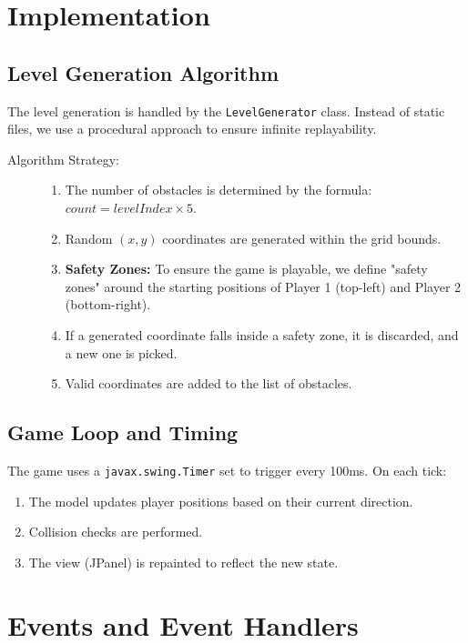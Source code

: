 \documentclass[12pt,a4paper]{article}
\begin{document}
\section{Implementation}

\subsection{Level Generation Algorithm}
The level generation is handled by the \texttt{LevelGenerator} class. Instead of static files, we use a procedural approach to ensure infinite replayability.

\begin{description}
    \item[Algorithm Strategy:]
    \begin{enumerate}
        \item The number of obstacles is determined by the formula: $count = levelIndex \times 5$.
        \item Random $(x, y)$ coordinates are generated within the grid bounds.
        \item \textbf{Safety Zones:} To ensure the game is playable, we define "safety zones" around the starting positions of Player 1 (top-left) and Player 2 (bottom-right).
        \item If a generated coordinate falls inside a safety zone, it is discarded, and a new one is picked.
        \item Valid coordinates are added to the list of obstacles.
    \end{enumerate}
\end{description}

\subsection{Game Loop and Timing}
The game uses a \texttt{javax.swing.Timer} set to trigger every 100ms. On each tick:
\begin{enumerate}
    \item The model updates player positions based on their current direction.
    \item Collision checks are performed.
    \item The view (JPanel) is repainted to reflect the new state.
\end{enumerate}

\section{Events and Event Handlers}
\end{document}
